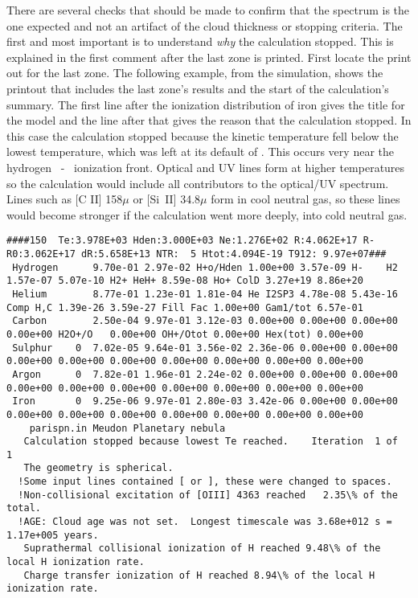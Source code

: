 There are several checks that should be made to confirm that the spectrum
is the one expected and not an artifact of the cloud thickness or stopping
criteria.
The first and most important is to understand \emph{why} the calculation
stopped.
This is explained in the first comment after the last zone is
printed.
First locate the print out for the last zone.
The following
example, from the  simulation, shows the printout that includes
the last zone's results and the start of the calculation's summary.
The
first line after the ionization distribution of iron gives the title for
the model and the line after that gives the reason that the calculation
stopped.
In this case the calculation stopped because the kinetic
temperature fell below the lowest temperature, which was left at its
default of \TEMPSTOPDEFAULT.
This occurs very near the hydrogen \hplus\ - \hO\ ionization front.
Optical and UV lines form at higher temperatures so the calculation would
include all contributors to the optical/UV spectrum.
Lines such as [C II]
158$\mu$ or [Si~II] 34.8$\mu$ form in cool neutral gas,
so these lines would become
stronger if the calculation went more deeply, into cold neutral gas.

{\setverbatimfontsize{\tiny}
\begin{verbatim}
####150  Te:3.978E+03 Hden:3.000E+03 Ne:1.276E+02 R:4.062E+17 R-R0:3.062E+17 dR:5.658E+13 NTR:  5 Htot:4.094E-19 T912: 9.97e+07###
 Hydrogen      9.70e-01 2.97e-02 H+o/Hden 1.00e+00 3.57e-09 H-    H2 1.57e-07 5.07e-10 H2+ HeH+ 8.59e-08 Ho+ ColD 3.27e+19 8.86e+20
 Helium        8.77e-01 1.23e-01 1.81e-04 He I2SP3 4.78e-08 5.43e-16 Comp H,C 1.39e-26 3.59e-27 Fill Fac 1.00e+00 Gam1/tot 6.57e-01
 Carbon        2.50e-04 9.97e-01 3.12e-03 0.00e+00 0.00e+00 0.00e+00 0.00e+00 H2O+/O   0.00e+00 OH+/Otot 0.00e+00 Hex(tot) 0.00e+00
 Sulphur    0  7.02e-05 9.64e-01 3.56e-02 2.36e-06 0.00e+00 0.00e+00 0.00e+00 0.00e+00 0.00e+00 0.00e+00 0.00e+00 0.00e+00 0.00e+00
 Argon      0  7.82e-01 1.96e-01 2.24e-02 0.00e+00 0.00e+00 0.00e+00 0.00e+00 0.00e+00 0.00e+00 0.00e+00 0.00e+00 0.00e+00 0.00e+00
 Iron       0  9.25e-06 9.97e-01 2.80e-03 3.42e-06 0.00e+00 0.00e+00 0.00e+00 0.00e+00 0.00e+00 0.00e+00 0.00e+00 0.00e+00 0.00e+00
    parispn.in Meudon Planetary nebula
   Calculation stopped because lowest Te reached.    Iteration  1 of  1
   The geometry is spherical.
  !Some input lines contained [ or ], these were changed to spaces.
  !Non-collisional excitation of [OIII] 4363 reached   2.35\% of the total.
  !AGE: Cloud age was not set.  Longest timescale was 3.68e+012 s = 1.17e+005 years.
   Suprathermal collisional ionization of H reached 9.48\% of the local H ionization rate.
   Charge transfer ionization of H reached 8.94\% of the local H ionization rate.
\end{verbatim}
}

